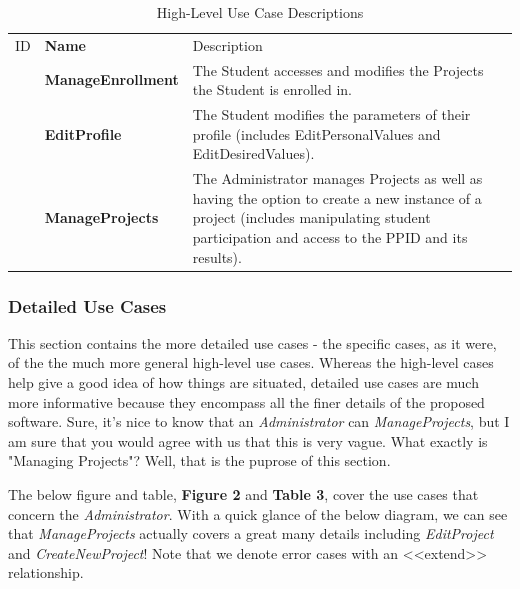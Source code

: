 \documentclass[12pt,letterpaper]{article}
\begin{document}
\begin{table}[H]
	\caption{High-Level Use Case Descriptions}
	\begin{tabu} to 
	    \tableheader{}ID & Name & Description\\
	    \manageenrollment{} & ManageEnrollment & The Student accesses and modifies the Projects the Student is enrolled in.\\
		\editprofile{} & EditProfile & The Student modifies the parameters of their profile (includes EditPersonalValues and EditDesiredValues).\\
		\manageprojects{} & ManageProjects & The Administrator manages Projects as well as having the option to create a new instance of a project (includes manipulating student participation and access to the PPID and its results).\\
	\end{tabu}
\end{table}

\subsubsection*{Detailed Use Cases}

This section contains the more detailed use cases - the specific cases, as it were, of the the much more general high-level use cases. Whereas the high-level cases help give a good
idea of how things are situated, detailed use cases are much more informative because they encompass all the finer details of the proposed software. Sure, it's nice to know that
an {\it Administrator} can {\it ManageProjects}, but I am sure that you would agree with us that this is very vague. What exactly is "Managing Projects"? Well, that is the puprose of this 
section. 

The below figure and table, {\bf Figure 2} and {\bf Table 3}, cover the use cases that concern the {\it Administrator}. With a quick glance of the below diagram, we can see that {\it ManageProjects} actually covers a 
great many details including {\it EditProject} and {\it CreateNewProject}! Note that we denote error cases with an <<extend>> relationship.
\end{document}
